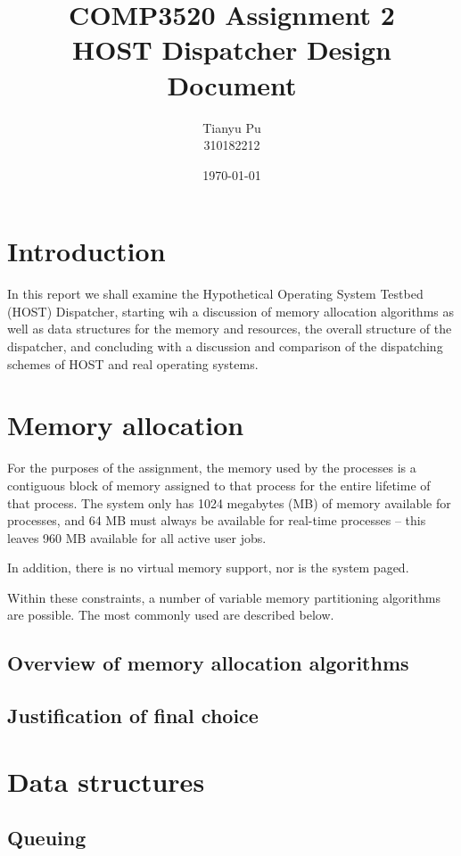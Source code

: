 \documentclass[12pt]{article}
\title{COMP3520 Assignment 2\\
  HOST Dispatcher Design Document}
\author{Tianyu Pu\\
  310182212}
\date{\today}
\begin{document}
\maketitle

\section{Introduction}
In this report we shall examine the Hypothetical Operating System Testbed
(HOST) Dispatcher, starting wih a discussion of memory allocation
algorithms as well as data structures for the memory and resources, the overall
structure of the dispatcher, and concluding with a discussion and comparison
of the dispatching schemes of HOST and real operating systems.
\cite{ausmines}

\section{Memory allocation}
For the purposes of the assignment, the memory used by the processes is a
contiguous block of memory assigned to that process for the entire lifetime of
that process. The system only has 1024 megabytes (MB) of memory available for
processes, and 64 MB must always be available for real-time processes -- this
leaves 960 MB available for all active user jobs.

In addition, there is no virtual memory support, nor is the system paged.

Within these constraints, a number of variable memory partitioning algorithms
are possible. The most commonly used are described below.

\subsection{Overview of memory allocation algorithms}

\subsection{Justification of final choice}

\section{Data structures}

\subsection{Queuing}
\end{document}
